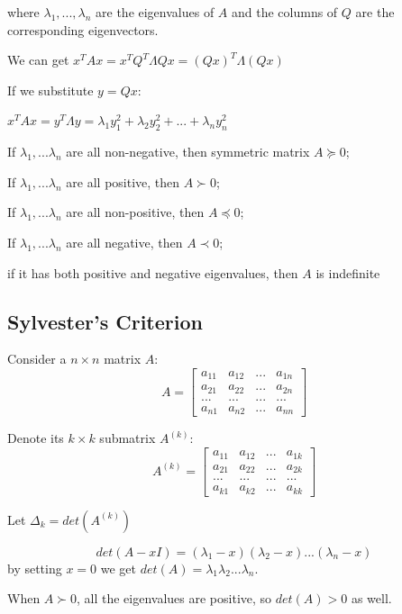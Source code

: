 \documentclass[11pt]{elegantbook}
\begin{document}
where $\lambda_1, . . ., \lambda_n$ are the eigenvalues of $A$ and the columns of $Q$ are the corresponding eigenvectors.

    We can get $x^TAx=x^TQ^T\Lambda Qx=(Qx)^T\Lambda(Qx)$
    
    If we substitute $y=Qx$:
    
    $x^TAx=y^T\Lambda y=\lambda_1y_1^2+\lambda_2y_2^2+...+\lambda_ny_n^2$

\begin{theorem}
    \quad

    If $\lambda_1,...\lambda_n$ are all non-negative, then symmetric matrix $A\succeq 0$;
    
    If $\lambda_1,...\lambda_n$ are all positive, then $A\succ 0$;
    
    If $\lambda_1,...\lambda_n$ are all non-positive, then $A\preceq 0$;
    
    If $\lambda_1,...\lambda_n$ are all negative, then $A\prec 0$;
    
    if it has both positive and negative eigenvalues, then $A$ is indefinite
\end{theorem}

\subsection{Sylvester’s Criterion}

Consider a $n\times n$ matrix $A$: $$A=\begin{bmatrix}
    a_{11}&a_{12}&... &a_{1n}\\a_{21}&a_{22}&...&a_{2n}\\...&...&...&...\\a_{n1}&a_{n2}&...&a_{nn}
\end{bmatrix}$$

Denote its $k\times k$ submatrix $A^{(k)}$:
$$A^{(k)}=\begin{bmatrix}
    a_{11}&a_{12}&... &a_{1k}\\a_{21}&a_{22}&...&a_{2k}\\...&...&...&...\\a_{k1}&a_{k2}&...&a_{kk}
\end{bmatrix}$$

Let $\Delta_k=det(A^{(k)})$

$$det(A-xI)=(\lambda_1-x)(\lambda_2-x)...(\lambda_n-x)$$
by setting $x = 0$ we get $det(A) = \lambda_1\lambda_2...\lambda_n$.

When $A\succ 0$, all the eigenvalues are positive, so $det(A) > 0$ as well.
\end{document}
